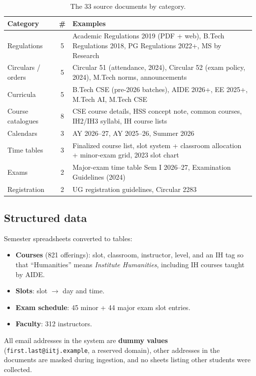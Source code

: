 \documentclass[10pt,a4paper]{article}
\newcommand{\code}[1]{\texttt{\small #1}}
\begin{document}
\begin{table}[H]
\centering\small
\begin{tabularx}{\linewidth}{l c X}
\toprule
Category & \# & Examples \\
\midrule
Regulations & 5 & Academic Regulations 2019 (PDF + web), B.Tech Regulations 2018, PG Regulations 2022+, MS by Research \\
Circulars / orders & 5 & Circular 51 (attendance, 2024), Circular 52 (exam policy, 2024), M.Tech norms, announcements \\
Curricula & 5 & B.Tech CSE (pre-2026 batches), AIDE 2026+, EE 2025+, M.Tech AI, M.Tech CSE \\
Course catalogues & 8 & CSE course details, HSS concept note, common courses, IH2/IH3 syllabi, IH course lists \\
Calendars & 3 & AY 2026--27, AY 2025--26, Summer 2026 \\
Time tables & 3 & Finalized course list, slot system + classroom allocation + minor-exam grid, 2023 slot chart \\
Exams & 2 & Major-exam time table Sem I 2026--27, Examination Guidelines (2024) \\
Registration & 2 & UG registration guidelines, Circular 2283 \\
\bottomrule
\end{tabularx}
\caption{The 33 source documents by category.}
\label{tab:data}
\end{table}

\subsection{Structured data}
Semester spreadsheets converted to tables:
\begin{itemize}
\item \textbf{Courses} (821 offerings): slot, classroom, instructor, level, and an IH tag so that
  ``Humanities'' means \emph{Institute Humanities}, including IH courses taught by AIDE.
\item \textbf{Slots}: slot $\rightarrow$ day and time.
\item \textbf{Exam schedule}: 45 minor + 44 major exam slot entries.
\item \textbf{Faculty}: 312 instructors.
\end{itemize}
All email addresses in the system are \textbf{dummy values} (\code{first.last@iitj.example}, a reserved
domain), other addresses in the documents are masked during ingestion, and no sheets listing other students
were collected.
\end{document}
